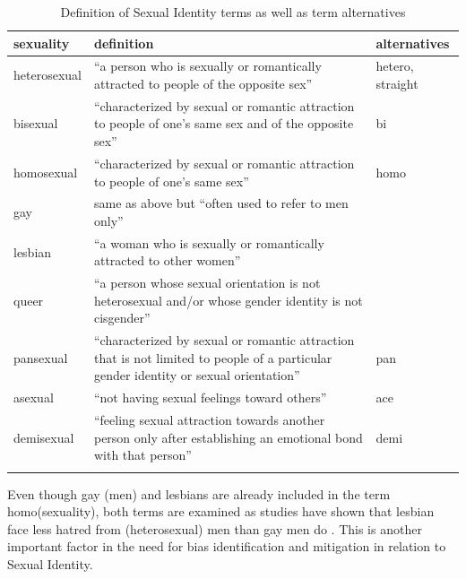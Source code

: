 \captionsetup{width=.95\textwidth}
\begin{longtable}{p{} p{} p{}}
        \textbf{sexuality} & \textbf{definition} & \textbf{alternatives}\\
        \toprule
        heterosexual &\small \enquote{a person who is sexually or romantically attracted to people of the opposite sex} \citep{Oxf:hetero} & \small hetero, straight \\\midrule
        bisexual &\small \enquote{characterized by sexual or romantic attraction to people of one's same sex and of the opposite sex} \citep{Oxf:bi} & \small   bi\\\midrule
        homosexual &\small \enquote{characterized by sexual or romantic attraction to people of one's same sex} \citep{Oxf:homo} & \small homo \\ \midrule
        gay &\small same as above but \enquote{often used to refer to men only} \citep{Oxf:gay} & \small \\ \midrule
        lesbian &\small \enquote{a woman who is sexually or romantically attracted to other women} \citep{Oxf:lesbian}  &\small  \\ \midrule
        queer &\small \enquote{a person whose sexual orientation is not heterosexual and/or whose gender identity is not cisgender} \citep{Oxf:queer} &\small  \\ \midrule
        pansexual &\small \enquote{characterized by sexual or romantic attraction that is not limited to people of a particular gender identity or sexual orientation} \citep{Oxf:pan}  & \small pan \small \\ \midrule
        asexual &\small \enquote{not having sexual feelings toward others} \citep{Oxf:ace} & \small ace \\ \midrule
        demisexual &\small \enquote{feeling sexual attraction towards another person only after establishing an emotional bond with that person} \citep{Oxf:demi} &\small demi\\ \midrule

    \caption[Sexual Identity Terms]{Definition of Sexual Identity terms as well as term alternatives}
    \label{tab:sexual-identity}
\end{longtable}

Even though gay (men) and lesbians are already included in the term homo(sexuality), both terms are examined as studies have shown that lesbian face less hatred from (heterosexual) men than gay men do \citep{moskowitz}. This is another important factor in the need for bias identification and mitigation in relation to Sexual Identity. 

